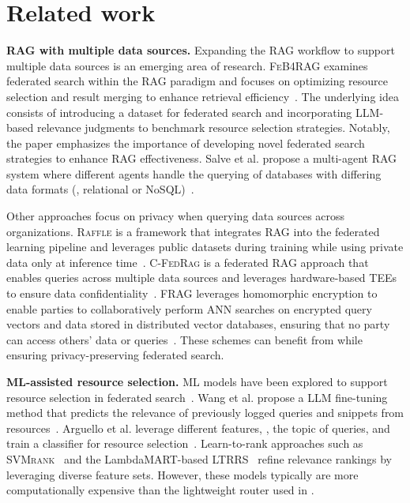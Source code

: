 \section{Related work}
\label{sec:related}

\textbf{\ac{RAG} with multiple data sources.}
Expanding the \ac{RAG} workflow to support multiple data sources is an emerging area of research.
\textsc{FeB4RAG} examines federated search within the RAG paradigm and focuses on optimizing resource selection and result merging to enhance retrieval efficiency~\cite{wang2024feb4rag}.
The underlying idea consists of introducing a dataset for federated search and incorporating \ac{LLM}-based relevance judgments to benchmark resource selection strategies.
Notably, the paper emphasizes the importance of developing novel federated search strategies to enhance \ac{RAG} effectiveness.
Salve et al. propose a multi-agent \ac{RAG} system where different agents handle the querying of databases with differing data formats (\eg, relational or NoSQL)~\cite{salve2024collaborative}.

Other approaches focus on privacy when querying data sources across organizations.
\textsc{Raffle} is a framework that integrates \ac{RAG} into the federated learning pipeline and leverages public datasets during training while using private data only at inference time~\cite{muhamedcache}.
\textsc{C-FedRag} is a federated \ac{RAG} approach that enables queries across multiple data sources and leverages hardware-based \acp{TEE} to ensure data confidentiality~\cite{addison2024c}.
\textsc{FRAG} leverages homomorphic encryption to enable parties to collaboratively perform \ac{ANN} searches on encrypted query vectors and data stored in distributed vector databases, ensuring that no party can access others' data or queries~\cite{zhao2024frag}.
These schemes can benefit from \sys while ensuring privacy-preserving federated search.







\textbf{\ac{ML}-assisted resource selection.}
\ac{ML} models have been explored to support resource selection in federated search~\cite{garba2023federated}.
Wang et al. propose a \ac{LLM} fine-tuning method that predicts the relevance of previously logged queries and snippets from resources~\cite{wang2024resllm}.
Arguello et al. leverage different features, \eg, the topic of queries, and train a classifier for resource selection~\cite{arguello2009classification}.
Learn-to-rank approaches such as \textsc{SVMrank}~\cite{dai2017learning} and the LambdaMART-based \textsc{LTRRS}~\cite{wu2019ltrrs} refine relevance rankings by leveraging diverse feature sets.
However, these models typically are more computationally expensive than the lightweight router used in \sys.


